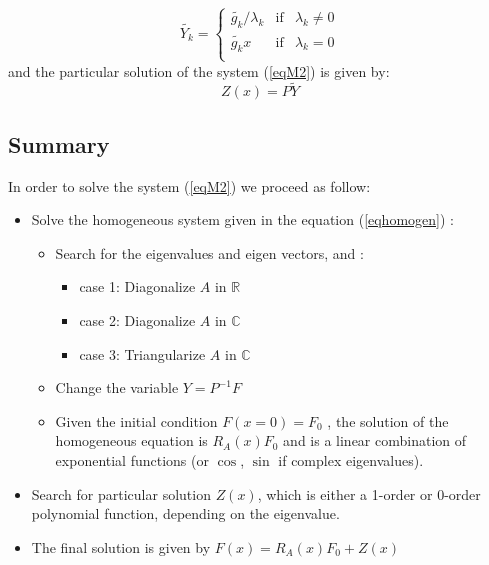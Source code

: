\documentclass[a4paper,12pt]{article}
\begin{document}
\begin{equation}
\widetilde{Y_k} = \left\lbrace
\begin{array}{lcl}
 \widetilde{g_k}/\lambda_k 		& \text{if}		& \lambda_k \neq 0\\
  \widetilde{g_k} x 						& \text{if}		& \lambda_k = 0\\
\end{array}\right.
\end{equation}
and the particular solution of the system (\ref{eqM2}) is given by:
\begin{equation}
Z(x) = P \widetilde{Y}
\end{equation}

\subsection{Summary}
In order to solve the system (\ref{eqM2}) we proceed as follow:
\begin{itemize}
\item Solve the homogeneous system given in the equation (\ref{eqhomogen}) :
	\begin{itemize}
	\item Search for the eigenvalues and eigen vectors, and : 
			\begin{itemize}
			\item case 1: Diagonalize $A$ in $\mathbb{R}$
			\item case 2: Diagonalize $A$ in $\mathbb{C}$ 
			\item case 3: Triangularize $A$ in $\mathbb{C}$
			\end{itemize}
	\item Change the variable $Y=P^{-1}F$
	\item Given the initial condition $F(x=0)=F_0$ , the solution of the homogeneous equation is $R_A(x)F_0$ and is a linear combination of exponential functions (or $\cos$, $\sin$ if complex eigenvalues).
	\end{itemize}
\item Search for particular solution $Z(x)$, which is either a 1-order or 0-order polynomial function, depending on the eigenvalue.
\item The final solution is given by $F(x) = R_A(x)F_0 + Z(x)$
\end{itemize}
\end{document}
